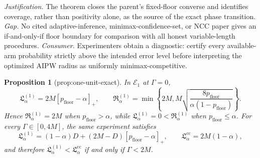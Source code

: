 \documentclass{article}
\newtheorem{proposition}{Proposition}
\begin{document}
\par\smallskip\noindent \textit{Justification.} The theorem closes the parent's fixed-floor converse and identifies coverage, rather than positivity alone, as the source of the exact phase transition. \textit{Gap.} No cited adaptive-inference, minimax-confidence-set, or NCC paper gives an if-and-only-if floor boundary for comparison with all honest variable-length procedures. \textit{Consumer.} Experimenters obtain a diagnostic: certify every available-arm probability strictly above the intended error level before interpreting the optimized AIPW radius as uniformly minimax-competitive.

\begin{proposition}[prop:one-unit-exact]\label{prop:one-unit-exact}
In \(\mathcal E_1\) at \(\Gamma=0\), \[\mathfrak L_\alpha^{(1)}=2M[p_{\mathrm{floor}}-\alpha]_+,\qquad \mathfrak R_\alpha^{(1)}=\min\left\{2M,M\sqrt{\frac{8p_{\mathrm{floor}}}{\alpha(1-p_{\mathrm{floor}})}}\right\}.\] Hence \(\mathfrak R_\alpha^{(1)}=2M\) when \(p_{\mathrm{floor}}>\alpha\), while \(\mathfrak L_\alpha^{(1)}=0<\mathfrak R_\alpha^{(1)}\) when \(p_{\mathrm{floor}}\le\alpha\). For every \(\Gamma\in[0,4M]\), the same experiment satisfies \[\mathfrak L_\alpha^{(1)}=(1-\alpha)D+(2M-D)[p_{\mathrm{floor}}-\alpha]_+,\qquad \mathfrak L_\alpha^{\mathrm{cc}}=2M(1-\alpha),\] and therefore \(\mathfrak L_\alpha^{(1)}<\mathfrak L_\alpha^{\mathrm{cc}}\) if and only if \(\Gamma<2M\).
\end{proposition}
\end{document}
